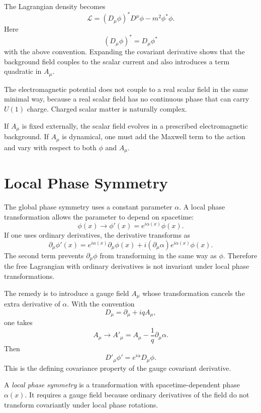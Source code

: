 The Lagrangian density becomes
\[
    \mathcal{L}
    =(D_\mu\phi)^*D^\mu\phi-m^2\phi^*\phi.
\]
Here
\[
    (D_\mu\phi)^*=D_\mu\phi^*
\]
with the above convention. Expanding the covariant derivative shows that the
background field couples to the scalar current and also introduces a term
quadratic in \(A_\mu\).

\begin{remarkbox}
The electromagnetic potential does not couple to a real scalar field in the same
minimal way, because a real scalar field has no continuous phase that can carry
\(U(1)\) charge. Charged scalar matter is naturally complex.
\end{remarkbox}

If \(A_\mu\) is fixed externally, the scalar field evolves in a prescribed
electromagnetic background. If \(A_\mu\) is dynamical, one must add the Maxwell
term to the action and vary with respect to both \(\phi\) and \(A_\mu\).

\section{Local Phase Symmetry}

The global phase symmetry uses a constant parameter \(\alpha\). A local phase
transformation allows the parameter to depend on spacetime:
\[
    \phi(x)\longrightarrow \phi'(x)=e^{i\alpha(x)}\phi(x).
\]
If one uses ordinary derivatives, the derivative transforms as
\[
    \partial_\mu\phi'(x)
    =e^{i\alpha(x)}\partial_\mu\phi(x)
     +i(\partial_\mu\alpha)e^{i\alpha(x)}\phi(x).
\]
The second term prevents \(\partial_\mu\phi\) from transforming in the same way
as \(\phi\). Therefore the free Lagrangian with ordinary derivatives is not
invariant under local phase transformations.

The remedy is to introduce a gauge field \(A_\mu\) whose transformation cancels
the extra derivative of \(\alpha\). With the convention
\[
    D_\mu=\partial_\mu+iqA_\mu,
\]
one takes
\[
    A_\mu\longrightarrow A'_\mu=A_\mu-\frac{1}{q}\partial_\mu\alpha.
\]
Then
\[
    D'_\mu\phi'=e^{i\alpha}D_\mu\phi.
\]
This is the defining covariance property of the gauge covariant derivative.

\begin{definitionbox}
A \emph{local phase symmetry} is a transformation with spacetime-dependent phase
\(\alpha(x)\). It requires a gauge field because ordinary derivatives of the
field do not transform covariantly under local phase rotations.
\end{definitionbox}

